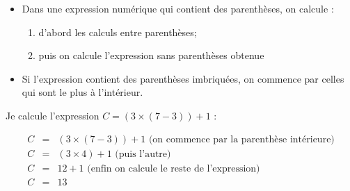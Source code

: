 \documentclass[14pt,a4paper]{extarticle}
\begin{document}
\begin{myprop}
	\begin{itemize}
		\item Dans une expression numérique qui contient des parenthèses, on calcule :
		\begin{enumerate}
			\item d'abord les calculs entre parenthèses;
			\item puis on calcule l'expression sans parenthèses obtenue
		\end{enumerate}
	
		\item Si l'expression contient des parenthèses imbriquées, on commence par celles qui sont le plus à l'intérieur.
	\end{itemize}
	
	
\end{myprop}

\begin{myex}
	Je calcule l'expression $C = (3 \times (7 - 3))  + 1$ :
	
	\vspace*{-0.5cm}
	
	\begin{eqnarray*}
		C & = & (3 \times (7-3))  + 1 \text{ (on commence par la parenthèse intérieure)} \\
		C & = & (3 \times 4)+ 1 \text{ (puis l'autre)} \\
		C & = & 12  + 1 \text{ (enfin on calcule le reste de l'expression)}\\
		C & = & 13
	\end{eqnarray*}
\end{myex}

\end{document}
